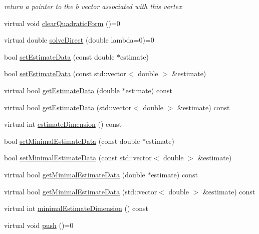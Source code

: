 \begin{DoxyCompactItemize}
\begin{DoxyCompactList}\small\item\em return a pointer to the b vector associated with this vertex \end{DoxyCompactList}\item 
virtual void \hyperlink{classg2o_1_1OptimizableGraph_1_1Vertex_a803897f6bae25dece4d7e23330f0f9da}{clear\-Quadratic\-Form} ()=0
\item 
virtual double \hyperlink{classg2o_1_1OptimizableGraph_1_1Vertex_a61c4e7b7a7a61e1f287069a8cb01004f}{solve\-Direct} (double lambda=0)=0
\item 
bool \hyperlink{classg2o_1_1OptimizableGraph_1_1Vertex_acebbe12160c0df7c859a349781badc30}{set\-Estimate\-Data} (const double $\ast$estimate)
\item 
bool \hyperlink{classg2o_1_1OptimizableGraph_1_1Vertex_a1cf16cd3b2e99169cdd6dfc139f926bc}{set\-Estimate\-Data} (const std\-::vector$<$ double $>$ \&estimate)
\item 
virtual bool \hyperlink{classg2o_1_1OptimizableGraph_1_1Vertex_af26618ca44b64685e2ea10f263b93182}{get\-Estimate\-Data} (double $\ast$estimate) const 
\item 
virtual bool \hyperlink{classg2o_1_1OptimizableGraph_1_1Vertex_a5664e886d4acaa3873ef9cf6ae18942d}{get\-Estimate\-Data} (std\-::vector$<$ double $>$ \&estimate) const 
\item 
virtual int \hyperlink{classg2o_1_1OptimizableGraph_1_1Vertex_ac8a19594a8356e9f104d8b383a10577e}{estimate\-Dimension} () const 
\item 
bool \hyperlink{classg2o_1_1OptimizableGraph_1_1Vertex_a57d42a1288d7377c593c91a8cf8a754c}{set\-Minimal\-Estimate\-Data} (const double $\ast$estimate)
\item 
bool \hyperlink{classg2o_1_1OptimizableGraph_1_1Vertex_ac41fda9360e81bf704681831b1df11f8}{set\-Minimal\-Estimate\-Data} (const std\-::vector$<$ double $>$ \&estimate)
\item 
virtual bool \hyperlink{classg2o_1_1OptimizableGraph_1_1Vertex_aff1e498690025bb1785c6313711adc99}{get\-Minimal\-Estimate\-Data} (double $\ast$estimate) const 
\item 
virtual bool \hyperlink{classg2o_1_1OptimizableGraph_1_1Vertex_acd8b1349bd9149b10e58797ccdabf6c7}{get\-Minimal\-Estimate\-Data} (std\-::vector$<$ double $>$ \&estimate) const 
\item 
virtual int \hyperlink{classg2o_1_1OptimizableGraph_1_1Vertex_a7dd3638e707eaf4f7e45b9f5ba77986d}{minimal\-Estimate\-Dimension} () const 
\item 
\hypertarget{classg2o_1_1OptimizableGraph_1_1Vertex_aa477ed33d30a01ed468f33bb2a2f2d9d}{virtual void \hyperlink{classg2o_1_1OptimizableGraph_1_1Vertex_aa477ed33d30a01ed468f33bb2a2f2d9d}{push} ()=0}\label{classg2o_1_1OptimizableGraph_1_1Vertex_aa477ed33d30a01ed468f33bb2a2f2d9d}


\end{DoxyCompactItemize}
